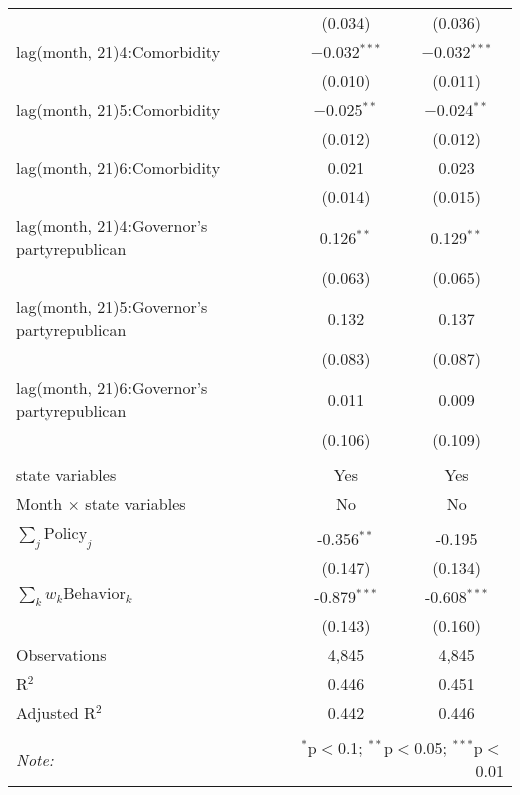 \begin{tabular}{@{\extracolsep{1pt}}lcc}
  & (0.034) & (0.036) \\ 
  lag(month, 21)4:Comorbidity & $-$0.032$^{***}$ & $-$0.032$^{***}$ \\ 
  & (0.010) & (0.011) \\ 
  lag(month, 21)5:Comorbidity & $-$0.025$^{**}$ & $-$0.024$^{**}$ \\ 
  & (0.012) & (0.012) \\ 
  lag(month, 21)6:Comorbidity & 0.021 & 0.023 \\ 
  & (0.014) & (0.015) \\ 
  lag(month, 21)4:Governor's partyrepublican & 0.126$^{**}$ & 0.129$^{**}$ \\ 
  & (0.063) & (0.065) \\ 
  lag(month, 21)5:Governor's partyrepublican & 0.132 & 0.137 \\ 
  & (0.083) & (0.087) \\ 
  lag(month, 21)6:Governor's partyrepublican & 0.011 & 0.009 \\ 
  & (0.106) & (0.109) \\ 
 \hline \\[-1.8ex] 
state variables & Yes & Yes \\ 
Month $\times$ state variables & No & No \\ 
\hline \\[-1.8ex] 
$\sum_j \mathrm{Policy}_j$ & -0.356$^{**}$ & -0.195 \\ 
 & (0.147) & (0.134) \\ 
$\sum_k w_k \mathrm{Behavior}_k$ & -0.879$^{***}$ & -0.608$^{***}$ \\ 
 & (0.143) & (0.160) \\ 
Observations & 4,845 & 4,845 \\ 
R$^{2}$ & 0.446 & 0.451 \\ 
Adjusted R$^{2}$ & 0.442 & 0.446 \\ 
\hline 
\hline \\[-1.8ex] 
\textit{Note:}  & \multicolumn{2}{r}{$^{*}$p$<$0.1; $^{**}$p$<$0.05; $^{***}$p$<$0.01} \\ 
\end{tabular} 
